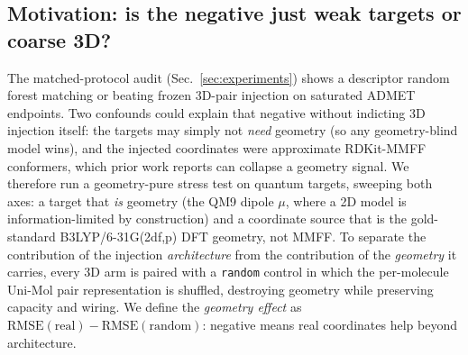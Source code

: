 \documentclass[sigconf,nonacm,anonymous,review]{acmart}
\begin{document}
\subsection{Motivation: is the negative just weak targets or coarse 3D?}
The matched-protocol audit (Sec.~\ref{sec:experiments}) shows a descriptor random forest matching or beating frozen 3D-pair injection on saturated ADMET endpoints. Two confounds could explain that negative without indicting 3D injection itself: the targets may simply not \emph{need} geometry (so any geometry-blind model wins), and the injected coordinates were approximate RDKit-MMFF conformers, which prior work reports can collapse a geometry signal. We therefore run a geometry-pure stress test on quantum targets, sweeping both axes: a target that \emph{is} geometry (the QM9 dipole $\mu$, where a 2D model is information-limited by construction) and a coordinate source that is the gold-standard B3LYP/6-31G(2df,p) DFT geometry, not MMFF. To separate the contribution of the injection \emph{architecture} from the contribution of the \emph{geometry} it carries, every 3D arm is paired with a \texttt{random} control in which the per-molecule Uni-Mol pair representation is shuffled, destroying geometry while preserving capacity and wiring. We define the \emph{geometry effect} as $\mathrm{RMSE}(\text{real}) - \mathrm{RMSE}(\text{random})$: negative means real coordinates help beyond architecture.
\end{document}
